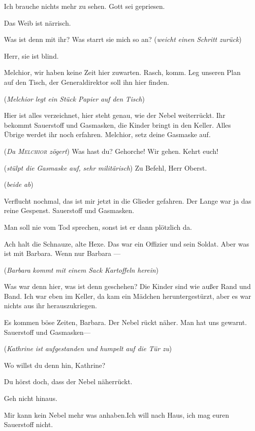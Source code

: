 \documentclass[
	final,
	a4paper,
	ngerman,
	mpinclude = true, %
	twoside = true,
	open = right,
	cleardoublepage = plain,
	DIV = 13,
	BCOR = 1cm,
	titlepage = firstiscover,
	]{scrbook}
\newcommand{\direction}[1]{(\textit{#1})}
\newcommand{\thecharacter}[1]{\textup{\textsc{#1}}\xspace}
\newcommand{\theBarbara}{\thecharacter{Barbara}}
\newcommand{\theJosef}{\thecharacter{Josef}}
\newcommand{\theKathrine}{\thecharacter{Kathrine}}
\newcommand{\theBrix}{\thecharacter{Oberst~Brix}}
\newcommand{\theMelchior}{\thecharacter{Melchior}}
\newcommand{\character}[1]{\item[#1]}
\newcommand{\Barbara}{\character{\theBarbara}}
\newcommand{\Josef}{\character{\theJosef}}
\newcommand{\Kathrine}{\character{\theKathrine}}
\newcommand{\Brix}{\character{\theBrix}}
\newcommand{\Melchior}{\character{\theMelchior}}
\begin{document}
\begin{play}
\Kathrine
Ich brauche nichts mehr zu sehen. Gott sei gepriesen.

\Melchior
Das Weib ist närrisch.

\Brix
Was ist denn mit ihr? Was starrt sie mich so an? \direction{weicht einen Schritt zurück}

\Josef
Herr, sie ist blind.

\Brix
Melchior, wir haben keine Zeit hier zuwarten. Rasch, komm. Leg unseren Plan auf den Tisch, der Generaldirektor soll ihn hier finden.

\direction{Melchior legt ein Stück Papier auf den Tisch}

Hier ist alles verzeichnet, hier steht genau, wie der Nebel weiterrückt. Ihr bekommt Sauerstoff und Gasmasken, die Kinder bringt in den Keller. Alles Übrige werdet ihr noch erfahren. Melchior, setz deine Gasmaske auf.

\direction{Da \theMelchior zögert} Was hast du? Gehorche! Wir gehen. Kehrt euch!

\Melchior
\direction{stülpt die Gasmaske auf, sehr militärisch} Zu Befehl, Herr Oberst.

\direction{beide ab}

\Josef
Verflucht nochmal, das ist mir jetzt in die Glieder gefahren. Der Lange war ja das reine Gespenst. Sauerstoff und Gasmasken.

\Kathrine
Man soll nie vom Tod sprechen, sonst ist er dann plötzlich da.

\Josef
Ach halt die Schnauze, alte Hexe. Das war ein Offizier und sein Soldat. Aber was ist mit Barbara. Wenn nur Barbara ---

\direction{Barbara kommt mit einem Sack Kartoffeln herein}

\Barbara
Was war denn hier, was ist denn geschehen? Die Kinder sind wie außer Rand und Band. Ich war eben im Keller, da kam ein Mädchen heruntergestürzt, aber es war nichts aus ihr herauszukriegen.

\Josef
Es kommen böse Zeiten, Barbara. Der Nebel rückt näher. Man hat uns gewarnt. Sauerstoff und Gasmasken---

\direction{Kathrine ist aufgestanden und humpelt auf die Tür zu}

\Barbara
Wo willst du denn hin, Kathrine?

\Josef
Du hörst doch, dass der Nebel näherrückt.

\Barbara
Geh nicht hinaus.

\Kathrine
Mir kann kein Nebel mehr was anhaben.Ich will nach Haus, ich mag euren Sauerstoff nicht.


\end{play}
\end{document}
